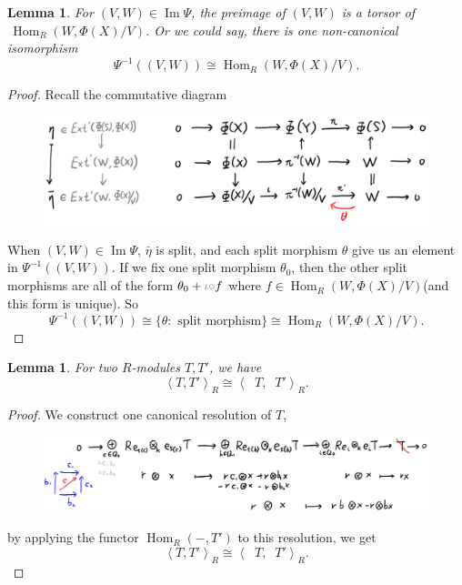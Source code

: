 \documentclass[reqno,11pt]{amsart}
\numberwithin{equation}{section}
\theoremstyle{plain}
\newtheorem{lemma}[theorem]{Lemma}
\theoremstyle{plain}
\numberwithin{equation}{section}
\theoremstyle{remark}
\DeclareMathOperator{\Img}{\operatorname{Im}}
\DeclareMathOperator{\Hom}{\operatorname{Hom}}
\DeclareMathOperator{\dimv}{\operatorname{\underline{\mathbf{dim}}}}
\begin{document}
\begin{lemma}
	For $(V,W) \in \Img \Psi$, the preimage of $(V,W)$ is a torsor of $\,\Hom_{R}(W,\Phi(X)/V)$. Or we could say, there is one non-canonical isomorphism
	$$\Psi^{-1}((V,W)) \cong \Hom_{R}(W,\Phi(X)/V).$$
\end{lemma}
\begin{proof}Recall the commutative diagram
\vspace{0cm}
\begin{center}
	\begin{figure}[ht]\label{fig:torsor}
		\vspace{0cm}
		\centering
		\includegraphics[width=15cm]{figures/torsor.png}
	\end{figure}
\end{center}
When $(V,W) \in \Img \Psi$, $\bar{\eta}$ is split, and each split morphism $\theta$ give us an element in $\Psi^{-1}((V,W))$. If we fix one split morphism $\theta_0$, then the other split morphisms are all of the form $\theta_0 + \textcolor{gray}{\iota \circ} f$ where $f \in \Hom_{R}(W,\Phi(X)/V)$(and this form is unique). So
$$\Psi^{-1}((V,W)) \cong \{ \theta: \text{ split morphism} \} \cong \Hom_{R}(W,\Phi(X)/V).$$
\end{proof}
\begin{lemma}
	For two $R$-modules $T,T'$, we have
	$$	\left< T,T'\right>_R \cong 	\left< \dimv T,\dimv T'\right>_R.$$
\end{lemma}
\begin{proof}
We construct one canonical resolution of $T$,

\begin{center}
	\begin{figure}[ht]\label{fig:resolution}
		\vspace{0cm}
		\centering
		\includegraphics[width=15cm]{figures/resolution.png}
	\end{figure}
\end{center}

by applying the functor $\Hom_R(-,T')$ to this resolution, we get
$$	\left< T,T'\right>_R \cong 	\left< \dimv T,\dimv T'\right>_R.$$
\end{proof}
\end{document}
